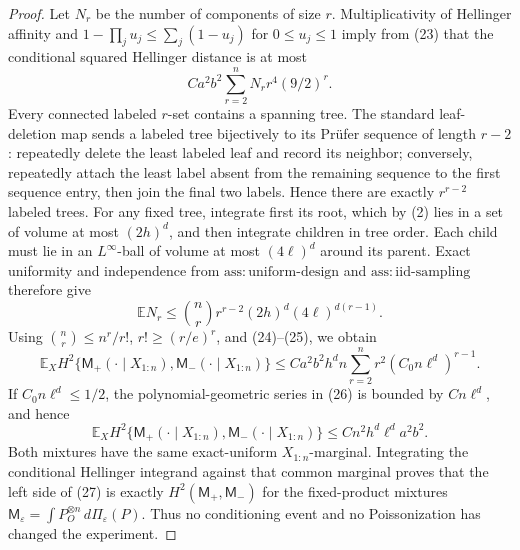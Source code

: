 \documentclass{article}
\begin{document}
\begin{proof}
Let \(N_r\) be the number of components of size \(r\).  Multiplicativity of Hellinger affinity and \(1-\prod_j u_j\le\sum_j(1-u_j)\) for \(0\le u_j\le1\) imply from (23) that the conditional squared Hellinger distance is at most
\[
 Ca^2b^2\sum_{r=2}^n N_r r^4(9/2)^r.                            \tag{24}
\]
Every connected labeled \(r\)-set contains a spanning tree.  The standard leaf-deletion map sends a labeled tree bijectively to its Pr\"ufer sequence of length \(r-2\): repeatedly delete the least labeled leaf and record its neighbor; conversely, repeatedly attach the least label absent from the remaining sequence to the first sequence entry, then join the final two labels.  Hence there are exactly \(r^{r-2}\) labeled trees.  For any fixed tree, integrate first its root, which by (2) lies in a set of volume at most \((2h)^d\), and then integrate children in tree order.  Each child must lie in an \(L^\infty\)-ball of volume at most \((4\ell)^d\) around its parent.  Exact uniformity and independence from \(\mathrm{ass:uniform\mbox{-}design}\) and \(\mathrm{ass:iid\mbox{-}sampling}\) therefore give
\[
 \mathbb E N_r
 \le {n\choose r}r^{r-2}(2h)^d(4\ell)^{d(r-1)}.                 \tag{25}
\]
Using \({n\choose r}\le n^r/r!\), \(r!\ge(r/e)^r\), and (24)--(25), we obtain
\[
 \mathbb E_XH^2\{\mathsf M_+(\cdot\mid X_{1:n}),
                         \mathsf M_-(\cdot\mid X_{1:n})\}
 \le Ca^2b^2h^dn
 \sum_{r=2}^n r^2(C_0n\ell^d)^{r-1}.                            \tag{26}
\]
If \(C_0n\ell^d\le1/2\), the polynomial-geometric series in (26) is bounded by \(C n\ell^d\), and hence
\[
 \mathbb E_XH^2\{\mathsf M_+(\cdot\mid X_{1:n}),
                         \mathsf M_-(\cdot\mid X_{1:n})\}
 \le Cn^2h^d\ell^da^2b^2.                                     \tag{27}
\]
Both mixtures have the same exact-uniform \(X_{1:n}\)-marginal.  Integrating the conditional Hellinger integrand against that common marginal proves that the left side of (27) is exactly \(H^2(\mathsf M_+,\mathsf M_-)\) for the fixed-product mixtures \(\mathsf M_\varepsilon=\int P_O^{\otimes n}\,d\Pi_\varepsilon(P)\).  Thus no conditioning event and no Poissonization has changed the experiment.


\end{proof}
\end{document}
